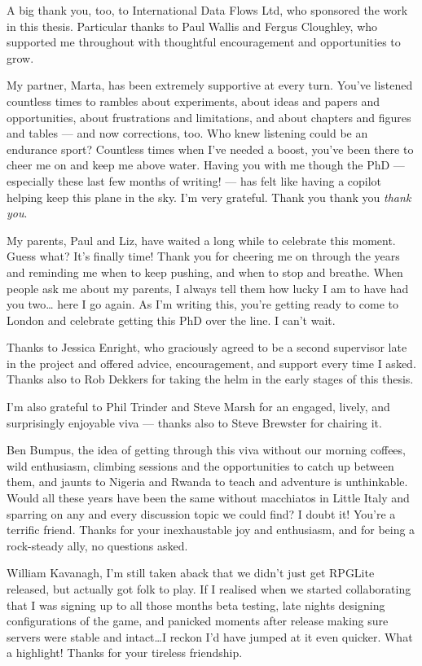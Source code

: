 {A big thank you, too, to International Data Flows Ltd, who sponsored the work in
this thesis. Particular thanks to Paul Wallis and Fergus Cloughley, who
supported me throughout with thoughtful encouragement and opportunities to grow.

My partner, Marta, has been extremely supportive at every turn. You've listened
countless times to rambles about experiments, about ideas and papers and
opportunities, about frustrations and limitations, and about chapters and
figures and tables --- and now corrections, too. Who knew listening could be an
endurance sport? Countless times when I've needed a boost, you've been there to
cheer me on and keep me above water. Having you with me though the PhD ---
especially these last few months of writing! --- has felt like having a copilot
helping keep this plane in the sky. I'm very grateful. Thank you thank you
\emph{thank you}.

My parents, Paul and Liz, have waited a long while to celebrate this moment.
Guess what? It's finally time! Thank you for cheering me on through the years
and reminding me when to keep pushing, and when to stop and breathe. When people
ask me about my parents, I always tell them how lucky I am to have had you
two\ldots{} here I go again. As I'm writing this, you're getting ready to come
to London and celebrate getting this PhD over the line. I can't wait.

Thanks to Jessica Enright, who graciously agreed to be a second supervisor
late in the project and offered advice, encouragement, and support every time I
asked. Thanks also to Rob Dekkers for taking the helm in the early stages of
this thesis.

I'm also grateful to Phil Trinder and Steve Marsh for an engaged, lively, and
surprisingly enjoyable viva — thanks also to Steve Brewster for chairing it.

Ben Bumpus, the idea of getting through this viva without our morning coffees,
wild enthusiasm, climbing sessions and the opportunities to catch up between
them, and jaunts to Nigeria and Rwanda to teach and adventure is unthinkable.
Would all these years have been the same without macchiatos in Little Italy and
sparring on any and every discussion topic we could find? I doubt it! You're a
terrific friend. Thanks for your inexhaustable joy and enthusiasm, and for being
a rock-steady ally, no questions asked.

William Kavanagh, I'm still taken aback that we didn't just get RPGLite
released, but actually got folk to play. If I realised when we started
collaborating that I was signing up to all those months beta testing, late
nights designing configurations of the game, and panicked moments after release
making sure servers were stable and intact\ldots{}I reckon I'd have jumped at it
even quicker. What a highlight! Thanks for your tireless friendship.

}
